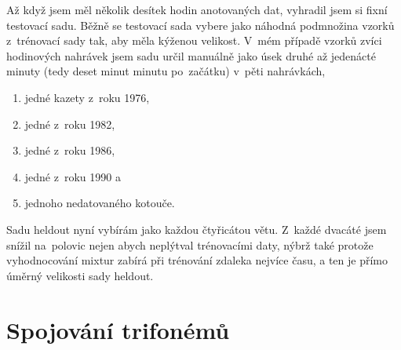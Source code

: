 Až když jsem měl několik desítek hodin anotovaných dat, vyhradil jsem si fixní
testovací sadu. Běžně se testovací sada vybere jako náhodná podmnožina vzorků
z~trénovací sady tak, aby měla kýženou velikost. V~mém případě vzorků zvíci
hodinových nahrávek jsem sadu určil manuálně jako úsek druhé až jedenácté minuty
(tedy deset minut minutu po~začátku) v~pěti nahrávkách,
\begin{enumerate}
\item{jedné kazety z~roku 1976,}
\item{jedné z~roku 1982,}
\item{jedné z~roku 1986,}
\item{jedné z~roku 1990 a}
\item{jednoho nedatovaného kotouče.}
\end{enumerate}

Sadu heldout nyní vybírám jako každou čtyřicátou větu. Z~každé dvacáté jsem
snížil na~polovic nejen abych neplýtval trénovacími daty, nýbrž také protože
vyhodnocování mixtur zabírá při trénování zdaleka nejvíce času, a ten je přímo
úměrný velikosti sady heldout.

\section{Spojování trifonémů}

